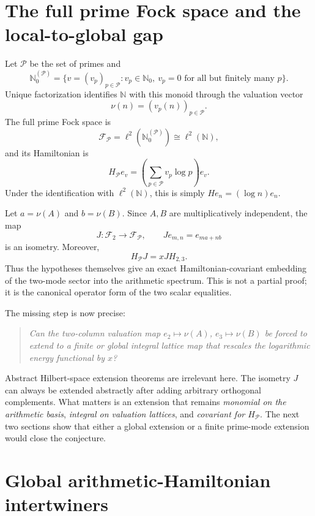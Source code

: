 \documentclass[11pt,oneside]{article}
\theoremstyle{definition}
\theoremstyle{remark}
\newcommand{\N}{\mathbb N}
\newcommand{\Nzero}{\mathbb N_0}
\newcommand{\cF}{\mathcal F}
\newcommand{\cP}{\mathcal P}
\begin{document}
\section{The full prime Fock space and the local-to-global gap}

Let \(\cP\) be the set of primes and
\[
        \Nzero^{(\cP)}
        =\{v=(v_p)_{p\in\cP}:v_p\in\Nzero,\ 
          v_p=0\text{ for all but finitely many }p\}.
\]
Unique factorization identifies \(\N\) with this monoid through the
valuation vector
\[
        \nu(n)=(v_p(n))_{p\in\cP}.
\]
The full prime Fock space is
\[
        \cF_{\cP}=\ell^2(\Nzero^{(\cP)})\cong\ell^2(\N),
\]
and its Hamiltonian is
\[
        H_{\cP}e_v
        =\left(\sum_{p\in\cP}v_p\log p\right)e_v.
\]
Under the identification with \(\ell^2(\N)\), this is simply
\(H e_n=(\log n)e_n\).

Let \(a=\nu(A)\) and \(b=\nu(B)\).  Since \(A,B\) are multiplicatively
independent, the map
\[
        J:\cF_2\longrightarrow\cF_{\cP},\qquad
        J e_{m,n}=e_{ma+nb}
\]
is an isometry.  Moreover,
\begin{equation}\label{eq:fock-embedding}
        H_{\cP}J=xJH_{2,3}.
\end{equation}
Thus the hypotheses themselves give an exact Hamiltonian-covariant
embedding of the two-mode sector into the arithmetic spectrum.  This is
not a partial proof; it is the canonical operator form of the two scalar
equalities.

The missing step is now precise:

\begin{quote}
\emph{Can the two-column valuation map
\(e_2\mapsto\nu(A)\), \(e_3\mapsto\nu(B)\) be forced to extend to a
finite or global integral lattice map that rescales the logarithmic
energy functional by \(x\)?}
\end{quote}

Abstract Hilbert-space extension theorems are irrelevant here.  The
isometry \(J\) can always be extended abstractly after adding arbitrary
orthogonal complements.  What matters is an extension that remains
\emph{monomial on the arithmetic basis}, \emph{integral on valuation
lattices}, and \emph{covariant for \(H_{\cP}\)}.  The next two sections
show that either a global extension or a finite prime-mode extension
would close the conjecture.


\section{Global arithmetic-Hamiltonian intertwiners}
\end{document}
